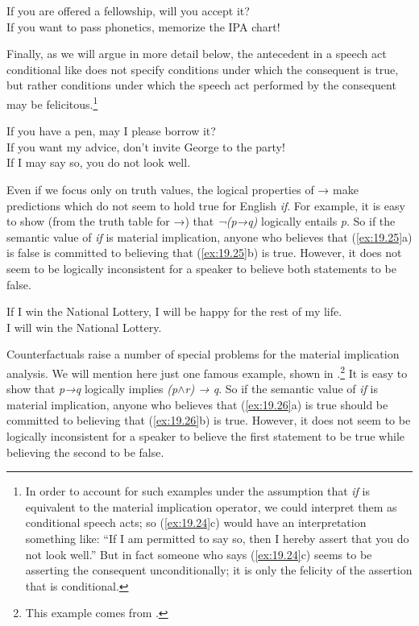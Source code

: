 \ea \label{ex:19.23}
\ea  If you are offered a fellowship, will you accept it?\\
\ex If you want to pass phonetics, memorize the IPA chart!
                       \z
\z


Finally, as we will argue in more detail below, the antecedent in a speech act conditional like  does not specify conditions under which the consequent is true, but rather conditions under which the speech act performed by the consequent may be felicitous.\footnote{In order to account for such examples under the assumption that \textit{if} is equivalent to the material implication operator, we could interpret them as conditional speech acts; so (\ref{ex:19.24}c) would have an interpretation something like: “If I am permitted to say so, then I hereby assert that you do not look well.” But in fact someone who says (\ref{ex:19.24}c) seems to be asserting the consequent unconditionally; it is only the felicity of the assertion that is conditional.}


\ea \label{ex:19.24}
\ea  If you have a pen, may I please borrow it?\\
\ex If you want my advice, don’t invite George to the party!\\
\ex If I may say so, you do not look well.
                       \z
\z


Even if we focus only on truth values, the logical properties of → make predictions which do not seem to hold true for English \textit{if}. For example, it is easy to show (from the truth table for →) that \textit{¬(p→q)} logically entails \textit{p}. So if the semantic value of \textit{if} is material implication, anyone who believes that (\ref{ex:19.25}a) is false is committed to believing that (\ref{ex:19.25}b) is true. However, it does not seem to be logically inconsistent for a speaker to believe both statements to be false.


\ea \label{ex:19.25}
\ea  If I win the National Lottery, I will be happy for the rest of my life.\\
\ex I will win the National Lottery.
                       \z
\z


Counterfactuals raise a number of special problems for the material implication analysis. We will mention here just one famous example, shown in .\footnote{This example comes from \citet{Lewis1973a}.} It is easy to show that \textit{p→q} logically implies \textit{(p}$\wedge$\textit{r) → q}. So if the semantic value of \textit{if} is material implication, anyone who believes that (\ref{ex:19.26}a) is true should be committed to believing that (\ref{ex:19.26}b) is true. However, it does not seem to be logically inconsistent for a speaker to believe the first statement to be true while believing the second to be false.


